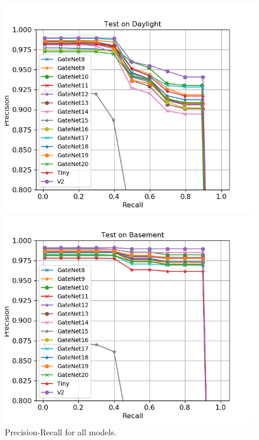 \documentclass{article}
\begin{document}
\begin{figure}
	\centering
	\begin{minipage}{0.45\linewidth}
		\includegraphics[width=\linewidth]{fig/test_daylight}
	\end{minipage}
	\begin{minipage}{0.45\linewidth}
		\includegraphics[width=\linewidth]{fig/test_basement}
	\end{minipage}
	\caption{Precision-Recall for all models.}
\end{figure}
\end{document}
